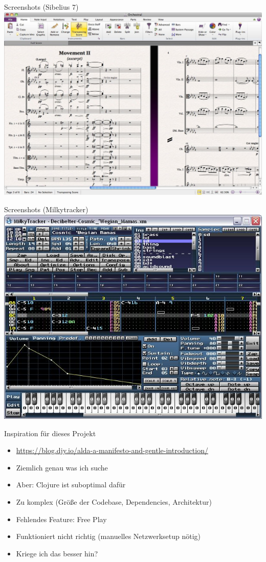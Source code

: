 \documentclass[presentation]{beamer}
\begin{document}
\begin{frame}[label=sec-1-4]{Screenshots (Sibelius 7)}
\includegraphics[width=.9\linewidth]{./scrots/sibelius7.jpg}
\end{frame}

\begin{frame}[label=sec-1-5]{Screenshots (Milkytracker)}
\includegraphics[width=.9\linewidth]{./scrots/milkytracker.jpg}
\end{frame}

\begin{frame}[label=sec-1-6]{Inspiration für dieses Projekt}
\begin{itemize}
\item \url{https://blog.djy.io/alda-a-manifesto-and-gentle-introduction/}
\item Ziemlich genau was ich suche
\item Aber: Clojure ist suboptimal dafür
\item Zu komplex (Größe der Codebase, Dependencies, Architektur)
\item Fehlendes Feature: Free Play
\item Funktioniert nicht richtig (manuelles Netzwerksetup nötig)
\item Kriege ich das besser hin?
\end{itemize}
\end{frame}
\end{document}
